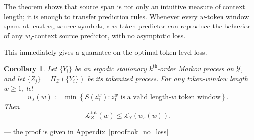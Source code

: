 \documentclass{article}
\theoremstyle{plain}
\newtheorem{corollary}[theorem]{Corollary}
\theoremstyle{definition}
\theoremstyle{remark}
\begin{document}
    The theorem shows that source span is not only an intuitive measure of context length; it is enough to transfer prediction rules. Whenever every $w$-token window spans at least $w_s$ source symbols, a $w$-token predictor can reproduce the behavior of any $w_s$-context source predictor, with no asymptotic loss.
    
    
    This immediately gives a guarantee on the optimal token-level loss.
    
    \begin{mainthmbox}
    \begin{corollary}
    \label{cor:tok_no_loss}
    Let $\{Y_i\}$ be an ergodic stationary $k^{\text{th}}$-order Markov process on
    $\mathcal{Y}$, and let $\{Z_j\}=\Pi_{\mathcal{Z}}(\{Y_i\})$ be its tokenized
    process. For any token-window length $w\ge 1$, let
    \[
        w_s(w)
        :=
        \min\left\{
            S(z_1^w)
            :
            z_1^w \text{ is a valid length-$w$ token window}
        \right\}.
    \]
    Then
    \[
        \mathcal{L}_Z^{\mathrm{tok}}(w)
        \le
        \mathcal{L}_Y(w_s(w)).
    \]
    \end{corollary}
    \end{mainthmbox} --- the proof is given in Appendix~\ref{proof:tok_no_loss}
    
    
    
    
\end{document}
